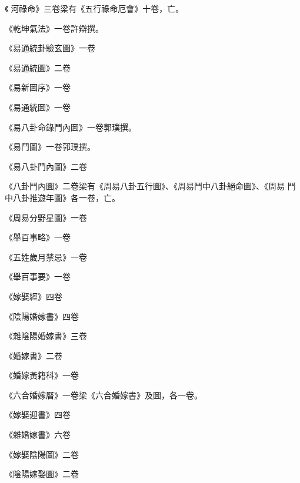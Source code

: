 \begin{pinyinscope}
 《河祿命》三卷梁有《五行祿命厄會》十卷，亡。



 《乾坤氣法》一卷許辯撰。



 《易通統卦驗玄圖》一卷



 《易通統圖》二卷



 《易新圖序》一卷



 《易通統圖》一卷



 《易八卦命錄鬥內圖》一卷郭璞撰。



 《易鬥圖》一卷郭璞撰。



 《易八卦鬥內圖》二卷



 《八卦鬥內圖》二卷梁有《周易八卦五行圖》、《周易鬥中八卦絕命圖》、《周易
 鬥中八卦推遊年圖》各一卷，亡。



 《周易分野星圖》一卷



 《舉百事略》一卷



 《五姓歲月禁忌》一卷



 《舉百事要》一卷



 《嫁娶經》四卷



 《陰陽婚嫁書》四卷



 《雜陰陽婚嫁書》三卷



 《婚嫁書》二卷



 《婚嫁黃籍科》一卷



 《六合婚嫁曆》一卷梁《六合婚嫁書》及圖，各一卷。



 《嫁娶迎書》四卷



 《雜婚嫁書》六卷



 《嫁娶陰陽圖》二卷



 《陰陽嫁娶圖》二卷




\end{pinyinscope}
